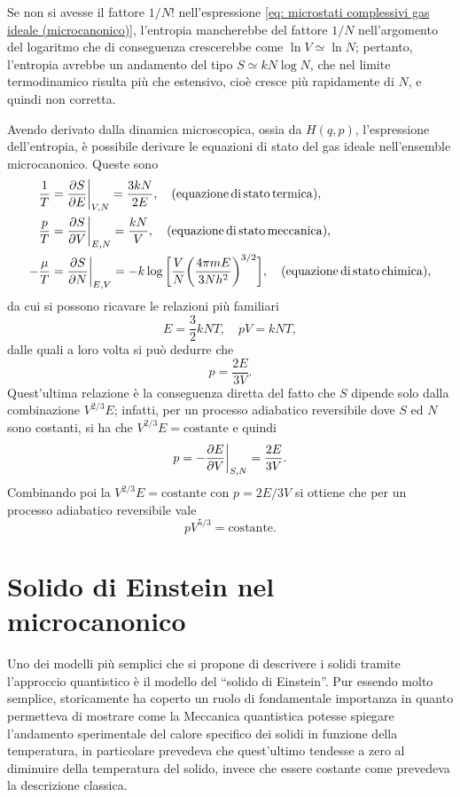 \begin{obs}
    Se non si avesse il fattore $1/N!$ nell'espressione \eqref{eq: microstati complessivi gas ideale (microcanonico)}, l'entropia mancherebbe del fattore $1/N$ nell'argomento del logaritmo che di conseguenza crescerebbe come $\ln{V} \simeq \ln{N}$; pertanto, l'entropia avrebbe un andamento del tipo $S \simeq kN\log{N}$, che nel limite termodinamico risulta più che estensivo, cioè cresce più rapidamente di $N$, e quindi non corretta.
\end{obs}
Avendo derivato dalla dinamica microscopica, ossia da $H(q,p)$, l'espressione dell'entropia, è possibile derivare le equazioni di stato del gas ideale nell'ensemble microcanonico. Queste sono
\begin{align}
    \frac{1}{T} &= \frac{\partial S}{\partial E}\bigg|_{V,N} = \frac{3kN}{2E},\quad(\mathrm{equazione\,di\,stato\,termica}), \\
    \frac{p}{T} &= \frac{\partial S}{\partial V}\bigg|_{E,N} = \frac{kN}{V},\quad(\mathrm{equazione\,di\,stato\,meccanica}), \\
    -\frac{\mu}{T} &= \frac{\partial S}{\partial N}\bigg|_{E,V} = -k\log{\bigg[\frac{V}{N}\bigg(\frac{4\pi mE}{3Nh^2}\bigg)^{3/2}\bigg]},\quad(\mathrm{equazione\,di\,stato\,chimica}),
\end{align}
da cui si possono ricavare le relazioni più familiari
\begin{equation}
    E = \frac{3}{2}kNT,\quad pV = kNT,
\end{equation}
dalle quali a loro volta si può dedurre che 
\begin{equation}
    p = \frac{2E}{3V}.
\end{equation}
Quest'ultima relazione è la conseguenza diretta del fatto che $S$ dipende solo dalla combinazione $V^{2/3}E$; infatti, per un processo adiabatico reversibile dove $S$ ed $N$ sono costanti, si ha che $V^{2/3}E = \mathrm{costante}$ e quindi 
\begin{equation}
    p = -\frac{\partial E}{\partial V}\bigg|_{S,N} = \frac{2E}{3V}.
\end{equation}
Combinando poi la $V^{2/3}E = \mathrm{costante}$ con $p = 2E/3V$ si ottiene che per un processo adiabatico reversibile vale
\begin{equation}
    pV^{5/3} = \mathrm{costante}.
\end{equation}

\section{Solido di Einstein nel microcanonico}
Uno dei modelli più semplici che si propone di descrivere i solidi tramite l'approccio quantistico è il modello del ``solido di Einstein''. Pur essendo molto semplice, storicamente ha coperto un ruolo di fondamentale importanza in quanto permetteva di mostrare come la Meccanica quantistica potesse spiegare l'andamento sperimentale del calore specifico dei solidi in funzione della temperatura, in particolare prevedeva che quest'ultimo tendesse a zero al diminuire della temperatura del solido, invece che essere costante come prevedeva la descrizione classica. 

